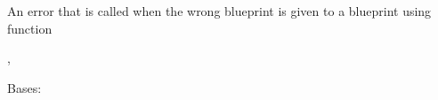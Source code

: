 \documentclass[letterpaper,10pt,english]{sphinxmanual}
\begin{document}
\begin{fulllineitems}
\label{\detokenize{pypoints:pypoints.IncompatibleBlueprintType}}
An error that is called when the wrong blueprint is given to a
blueprint using function




{\hyperref[\detokenize{pypoints:pypoints.Blueprint}]{}}, {\hyperref[\detokenize{pypoints:pypoints.Shape}]{}}



\end{fulllineitems}


\begin{fulllineitems}
\label{\detokenize{pypoints:pypoints.MenuBox}}
Bases: 

\begin{fulllineitems}
\label{\detokenize{pypoints:pypoints.MenuBox.draw}}
\end{fulllineitems}


\end{fulllineitems}

\end{document}
